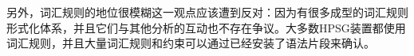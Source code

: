 
另外，词汇规则的地位很模糊这一观点应该遭到反对：因为有很多成型的词汇规则形式化体系\citep{Meurers2001a,CB92a,LC99a}，并且它们与其他分析的互动也不存在争议。大多数HPSG装置都使用词汇规则，并且大量词汇规则和约束可以通过已经安装了语法片段来确认。

